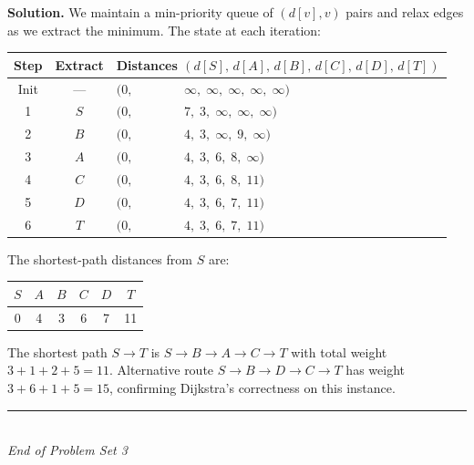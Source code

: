 \documentclass[11pt,a4paper]{article}
\theoremstyle{definition}
\theoremstyle{remark}
\begin{document}
\medskip
\textbf{Solution.} We maintain a min-priority queue of \((d[v], v)\) pairs
and relax edges as we extract the minimum. The state at each iteration:

\medskip
{\centering
\renewcommand{\arraystretch}{1.15}
\begin{tabular}{ccll}
\toprule
\textbf{Step} & \textbf{Extract} & \multicolumn{2}{c}{\textbf{Distances} \((d[S],\, d[A],\, d[B],\, d[C],\, d[D],\, d[T])\)} \\
\midrule
Init  & ---    & \((0,\) & \(\infty,\; \infty,\; \infty,\; \infty,\; \infty)\) \\
1     & \(S\)  & \((0,\) & \(7,\;           3,\;           \infty,\; \infty,\; \infty)\) \\
2     & \(B\)  & \((0,\) & \(4,\;           3,\;           \infty,\; 9,\;            \infty)\) \\
3     & \(A\)  & \((0,\) & \(4,\;           3,\;           6,\;           8,\;            \infty)\) \\
4     & \(C\)  & \((0,\) & \(4,\;           3,\;           6,\;           8,\;            11)\) \\
5     & \(D\)  & \((0,\) & \(4,\;           3,\;           6,\;           7,\;            11)\) \\
6     & \(T\)  & \((0,\) & \(4,\;           3,\;           6,\;           7,\;            11)\) \\
\bottomrule
\end{tabular}
\par}

\medskip
The shortest-path distances from \(S\) are:

\medskip
{\centering
\begin{tabular}{@{}c|c|c|c|c|c@{}}
\toprule
\(S\) & \(A\) & \(B\) & \(C\) & \(D\) & \(T\) \\
\midrule
0 & 4 & 3 & 6 & 7 & 11 \\
\bottomrule
\end{tabular}
\par}

\medskip
The shortest path \(S \to T\) is \(S \to B \to A \to C \to T\) with total
weight \(3 + 1 + 2 + 5 = 11\). Alternative route \(S \to B \to D \to C \to T\)
has weight \(3 + 6 + 1 + 5 = 15\), confirming Dijkstra's correctness on
this instance.

\vfill
\begin{center}
  \rule{0.25\linewidth}{0.4pt}\\[4pt]
  {\small\color{gray}\textit{End of Problem Set 3}}
\end{center}
\end{document}
